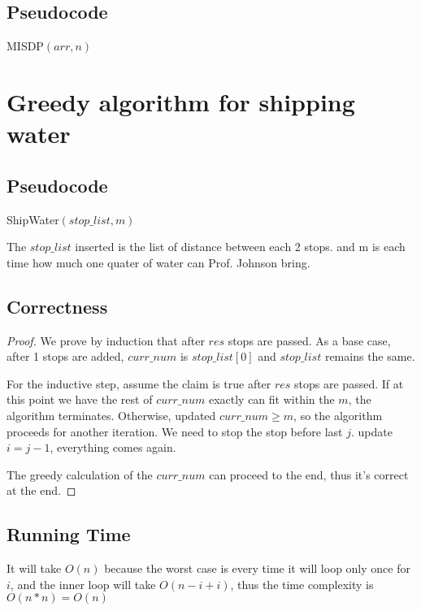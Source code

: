 \documentclass[a4paper]{article}
\begin{document}
\subsection{Pseudocode}
\begin{algorithm}
  \caption{MISDP$(arr,n)$}
  \begin{algorithmic}[1]
    \Else {}
    \Else
    \EndIf
    \EndIf
  \EndFor
  \EndFor
  \end{algorithmic}
\end{algorithm}

\section{Greedy algorithm for shipping water}
\subsection{Pseudocode}
\begin{algorithm}
  \caption{ShipWater$(stop\_list,m)$}
  \begin{algorithmic}[1]
      \Break
    \EndIf
    \EndFor
  \EndFor
  \EndFor
  \end{algorithmic}
\end{algorithm}
The $stop\_list$ inserted is the list of distance between each 2 stops. and m is each time how much one quater of water can Prof. Johnson bring.

\subsection{Correctness}
\begin{proof}
We prove by induction that after $res$ stops are passed. As a base case, after 1 stops are added, $curr\_num$ is $stop\_list[0]$ and $stop\_list$ remains the same.

For the inductive step, assume the claim is true after $res$ stops are passed. If at this point we have the rest of $curr\_num$ exactly can fit within the $m$, the algorithm terminates. Otherwise, updated $curr\_num \geq m$, so the algorithm proceeds for another iteration. We need to stop the stop before last $j$. update $i=j-1$, everything comes again.

The greedy calculation of the $curr\_num$ can proceed to the end, thus it's correct at the end.
\end{proof}
\subsection{Running Time}
It will take $O(n)$ because the worst case is every time it will loop only once for $i$, and the inner loop will take $O(n-i+i)$, thus the time complexity is $O(n*n)=O(n)$
\end{document}
